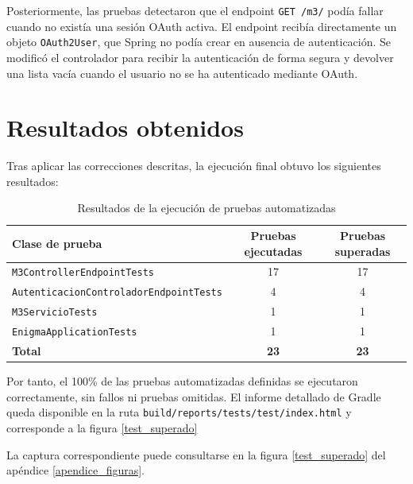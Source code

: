Posteriormente, las pruebas detectaron que el endpoint \texttt{GET /m3/} podía fallar cuando no existía una sesión OAuth activa. El endpoint recibía directamente un objeto \texttt{OAuth2User}, que Spring no podía crear en ausencia de autenticación. Se modificó el controlador para recibir la autenticación de forma segura y devolver una lista vacía cuando el usuario no se ha autenticado mediante OAuth.

\section{Resultados obtenidos}

Tras aplicar las correcciones descritas, la ejecución final obtuvo los siguientes resultados:

\begin{table}[htbp]
	\centering
	\hspace*{-2cm}
	\begin{tabular}{|l|c|c|}
		\hline
		\textbf{Clase de prueba} & \textbf{Pruebas ejecutadas} & \textbf{Pruebas superadas} \\
		\hline
		\texttt{M3ControllerEndpointTests} & 17 & 17 \\
		\hline
		\texttt{AutenticacionControladorEndpointTests} & 4 & 4 \\
		\hline
		\texttt{M3ServicioTests} & 1 & 1 \\
		\hline
		\texttt{EnigmaApplicationTests} & 1 & 1 \\
		\hline
		\textbf{Total} & \textbf{23} & \textbf{23} \\
		\hline
	\end{tabular}
	\caption{Resultados de la ejecución de pruebas automatizadas}
	\label{tabla_resultados_pruebas}
\end{table}

Por tanto, el 100\% de las pruebas automatizadas definidas se ejecutaron correctamente, sin fallos ni pruebas omitidas. El informe detallado de Gradle queda disponible en la ruta \texttt{build/reports/tests/test/index.html} y corresponde a la figura \ref{test_superado}

La captura correspondiente puede consultarse en la figura \ref{test_superado} del apéndice \ref{apendice_figuras}.

